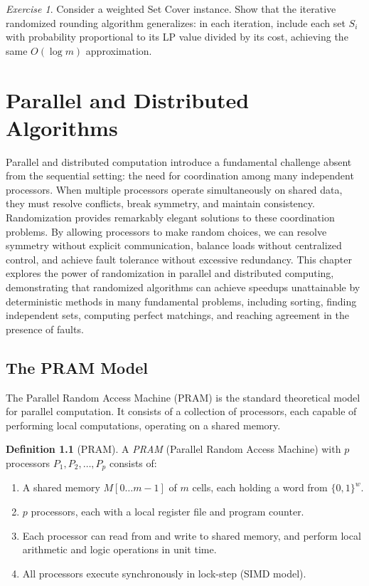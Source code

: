\documentclass[twoside,12pt]{book}
\theoremstyle{plain}
\theoremstyle{definition}
\newtheorem{definition}[theorem]{Definition}
\theoremstyle{remark}
\newtheorem{exercise}[theorem]{Exercise}
\begin{document}
\begin{exercise}
Consider a weighted Set Cover instance.  Show that the iterative
randomized rounding algorithm generalizes: in each iteration,
include each set $S_i$ with probability proportional to its LP value
divided by its cost, achieving the same $O(\log m)$ approximation.
\end{exercise}


\chapter{Parallel and Distributed Algorithms}
\label{ch:parallel}

Parallel and distributed computation introduce a fundamental challenge absent from the sequential setting: the need for coordination among many independent processors. When multiple processors operate simultaneously on shared data, they must resolve conflicts, break symmetry, and maintain consistency. Randomization provides remarkably elegant solutions to these coordination problems. By allowing processors to make random choices, we can resolve symmetry without explicit communication, balance loads without centralized control, and achieve fault tolerance without excessive redundancy. This chapter explores the power of randomization in parallel and distributed computing, demonstrating that randomized algorithms can achieve speedups unattainable by deterministic methods in many fundamental problems, including sorting, finding independent sets, computing perfect matchings, and reaching agreement in the presence of faults.

\section{The PRAM Model}
\label{sec:pram}

The Parallel Random Access Machine (PRAM) is the standard theoretical model for parallel computation. It consists of a collection of processors, each capable of performing local computations, operating on a shared memory.

\begin{definition}[PRAM]
\label{def:pram}
A \emph{PRAM} (Parallel Random Access Machine) with $p$ processors $P_1, P_2, \ldots, P_p$ consists of:
\begin{enumerate}[label=(\roman*)]
\item A shared memory $M[0 \ldots m-1]$ of $m$ cells, each holding a word from $\{0, 1\}^w$.
\item $p$ processors, each with a local register file and program counter.
\item Each processor can read from and write to shared memory, and perform local arithmetic and logic operations in unit time.
\item All processors execute synchronously in lock-step (SIMD model).
\end{enumerate}
\end{definition}
\end{document}
